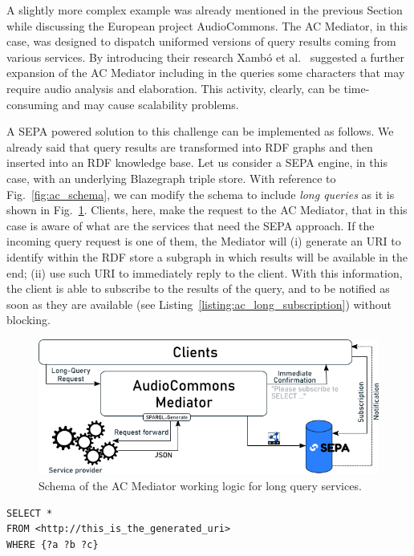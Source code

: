 A slightly more complex example was already mentioned in the previous Section while discussing the European project AudioCommons. The AC Mediator, in this case, was designed to dispatch uniformed versions of query results coming from various services. By introducing their research Xamb\'o et al.~\cite{xambo2018jam} suggested a further expansion of the AC Mediator including in the queries some characters that may require audio analysis and elaboration. This activity, clearly, can be time-consuming and may cause scalability problems.

A SEPA powered solution to this challenge can be implemented as follows. We already said that query results are transformed into RDF graphs and then inserted into an RDF knowledge base. Let us consider a SEPA engine, in this case, with an underlying Blazegraph triple store. With reference to Fig.~\ref{fig:ac_schema}, we can modify the schema to include \textit{long queries} as it is shown in Fig.~\ref{fig:ac_schema_long}. Clients, here, make the request to the AC Mediator, that in this case is aware of what are the services that need the SEPA approach. If the incoming query request is one of them, the Mediator will (i) generate an URI to identify within the RDF store a subgraph in which results will be available in the end; (ii) use such URI to immediately reply to the client. With this information, the client is able to subscribe to the results of the query, and to be notified as soon as they are available (see Listing~\ref{listing:ac_long_subscription}) without blocking. 
\begin{figure}
\centering
\includegraphics[width=\textwidth]{audiocommons_schema_sepa.png}
\caption{Schema of the AC Mediator working logic for long query services.}
\label{fig:ac_schema_long}
\end{figure}
\begin{minipage}{\linewidth}
\begin{lstlisting}[label=listing:ac_long_subscription,caption={Subscription example for the SEPA-enhanced AC Mediator.}]
SELECT * 
FROM <http://this_is_the_generated_uri>
WHERE {?a ?b ?c}
\end{lstlisting}
\end{minipage}

